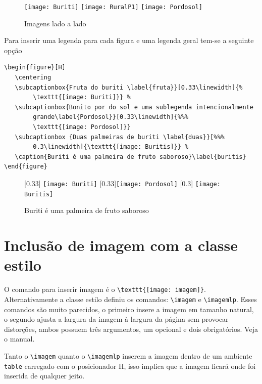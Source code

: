 \begin{figure}[H]
	\centering
	\texttt{[image: Buriti]}
	\texttt{[image: RuralP1]}
	\texttt{[image: Pordosol]}
	\caption{Imagens lado a lado}\label{ladoalado}
\end{figure}

Para inserir uma legenda para cada figura e uma legenda geral tem-se a seguinte opção
\begin{tcolorbox}
\begin{lstlisting}
\begin{figure}[H]
   \centering
   \subcaptionbox{Fruta do buriti \label{fruta}}[0.33\linewidth]{%
		\texttt{[image: Buriti]}} %
   \subcaptionbox{Bonito por do sol e uma sublegenda intencionalmente
        grande\label{Pordosol}}[0.33\linewidth]{%%%
        \texttt{[image: Pordosol]}}
   \subcaptionbox {Duas palmeiras de buriti \label{duas}}[%%%
        0.3\linewidth]{\texttt{[image: Buritis]}} %
   \caption{Buriti é uma palmeira de fruto saboroso}\label{buritis}
\end{figure}
\end{lstlisting}
\end{tcolorbox}
\begin{figure}[H]
	\centering
	[0.33\linewidth]{%
		\texttt{[image: Buriti]}} %
	[0.33\linewidth]{\texttt{[image: Pordosol]}}
	[0.3\linewidth]{%
		\texttt{[image: Buritis]}} %
	\caption{Buriti é uma palmeira de fruto saboroso}\label{buritis}
\end{figure}


\section{Inclusão de imagem com a classe estilo}

O comando para inserir imagem é o \verb|\texttt{[image: imagem]}|. 
Alternativamente a classe estilo definiu os comandos: \verb|\imagem| e 
\verb|\imagemlp|. Esses comandos são muito parecidos, o primeiro insere a imagem 
em tamanho natural, o segundo ajusta a largura da imagem à largura da página sem 
provocar distorções, ambos possuem três argumentos, um opcional e dois 
obrigatórios. Veja o manual.


Tanto o \verb|\imagem| quanto o \verb|\imagemlp| inserem a imagem dentro de um ambiente \texttt{table} carregado com o posicionador H, isso implica que a imagem ficará onde foi inserida de qualquer jeito.

